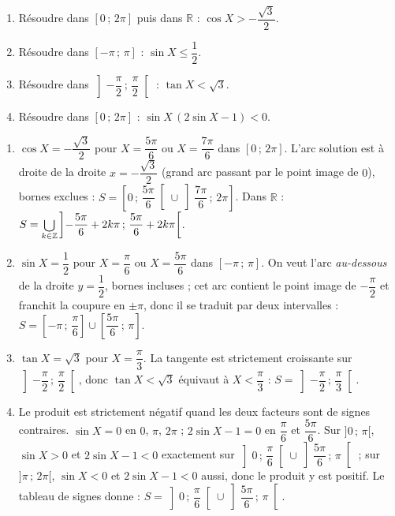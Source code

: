 \documentclass[11pt]{article}
\def\bigcup{\mathop{\mathchoice{\raisebox{-0.3em}{\scalebox{1.7}{$\cup$}}}{\scalebox{1.25}{$\cup$}}{\cup}{\cup}}\displaylimits}%
\begin{document}
\begin{exercice}
\begin{enumerate}
\item Résoudre dans $[0\,;\,2\pi]$ puis dans $\mathbb{R}$ : $\cos X > -\dfrac{\sqrt{3}}{2}$.
\item Résoudre dans $[-\pi\,;\,\pi]$ : $\sin X \leq \dfrac{1}{2}$.
\item Résoudre dans $\left]-\dfrac{\pi}{2}\,;\,\dfrac{\pi}{2}\right[$ : $\tan X < \sqrt{3}$.
\item Résoudre dans $[0\,;\,2\pi]$ : $\sin X \,(2\sin X - 1) < 0$.
\end{enumerate}
\end{exercice}

\begin{corrige}[Exercice]
\begin{enumerate}
\item $\cos X = -\dfrac{\sqrt{3}}{2}$ pour $X = \dfrac{5\pi}{6}$ ou $X = \dfrac{7\pi}{6}$ dans $[0\,;\,2\pi]$. L'arc solution est à droite de la droite $x = -\dfrac{\sqrt{3}}{2}$ (grand arc passant par le point image de $0$), bornes exclues : $S = \left[0\,;\,\dfrac{5\pi}{6}\right[ \cup \left]\dfrac{7\pi}{6}\,;\,2\pi\right]$. Dans $\mathbb{R}$ : $S = \displaystyle\bigcup_{k\in\mathbb{Z}} \left]-\dfrac{5\pi}{6} + 2k\pi\,;\,\dfrac{5\pi}{6} + 2k\pi\right[$.
\item $\sin X = \dfrac{1}{2}$ pour $X = \dfrac{\pi}{6}$ ou $X = \dfrac{5\pi}{6}$ dans $[-\pi\,;\,\pi]$. On veut l'arc \emph{au-dessous} de la droite $y = \dfrac12$, bornes incluses ; cet arc contient le point image de $-\dfrac{\pi}{2}$ et franchit la coupure en $\pm\pi$, donc il se traduit par deux intervalles : $S = \left[-\pi\,;\,\dfrac{\pi}{6}\right] \cup \left[\dfrac{5\pi}{6}\,;\,\pi\right]$.
\item $\tan X = \sqrt{3}$ pour $X = \dfrac{\pi}{3}$. La tangente est strictement croissante sur $\left]-\dfrac{\pi}{2}\,;\,\dfrac{\pi}{2}\right[$, donc $\tan X < \sqrt{3}$ équivaut à $X < \dfrac{\pi}{3}$ : $S = \left]-\dfrac{\pi}{2}\,;\,\dfrac{\pi}{3}\right[$.
\item Le produit est strictement négatif quand les deux facteurs sont de signes contraires. $\sin X = 0$ en $0$, $\pi$, $2\pi$ ; $2\sin X - 1 = 0$ en $\dfrac{\pi}{6}$ et $\dfrac{5\pi}{6}$. Sur $]0\,;\,\pi[$, $\sin X > 0$ et $2\sin X - 1 < 0$ exactement sur $\left]0\,;\,\dfrac{\pi}{6}\right[ \cup \left]\dfrac{5\pi}{6}\,;\,\pi\right[$ ; sur $]\pi\,;\,2\pi[$, $\sin X < 0$ et $2\sin X - 1 < 0$ aussi, donc le produit y est positif. Le tableau de signes donne : $S = \left]0\,;\,\dfrac{\pi}{6}\right[ \cup \left]\dfrac{5\pi}{6}\,;\,\pi\right[$.
\end{enumerate}
\end{corrige}
\end{document}
